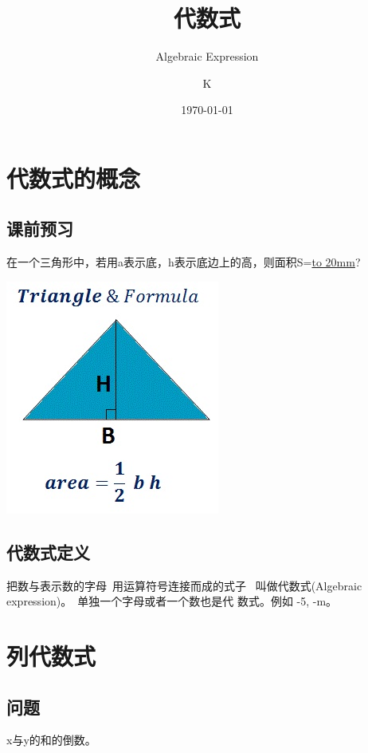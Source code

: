 \documentclass{beamer}
\title{代数式}
\subtitle{Algebraic Expression}
\institute{Norsesun Milieu}
\author{K}
\date{\today}
\begin{document}
	\frame{\titlepage}

	\section{代数式的概念}
	\subsection{课前预习}
	\begin{frame}
			在一个三角形中，若用a表示底，h表示底边上的高，则面积S=\underline{\hbox to 20mm{}}?

		\includegraphics[width = .5\textwidth]{assets/triangle.jpg}
	\end{frame}

	\subsection{代数式定义}
	\begin{frame}
			把数与表示数的字母\ 用运算符号连接而成的式子
			\ 叫做代数式(Algebraic expression)。\ 单独一个字母或者一个数也是代					数式。例如 -5, -m。
	\end{frame}

	\section{列代数式}
	\subsection{问题}
	\begin{frame}
			x与y的和的倒数。
	\end{frame}
\end{document}
